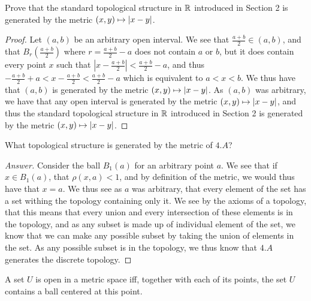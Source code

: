 \begin{majorEx}%
    Prove that the standard topological structure in $\mathbb{R}$ introduced in Section
    2 is generated by the metric $(x, y) \mapsto |x - y|$.
\end{majorEx}

\begin{proof}
  Let $(a,b)$ be an arbitrary open interval. We see that $\frac{a+b}{2}\in
  (a,b)$, and that $B_r(\frac{a+b}{2})$ where $r=\frac{a+b}{2}-a$ does
  not contain $a$ or $b$, but it does contain every point $x$ such
  that $|x-\frac{a+b}{2}|<\frac{a+b}{2}-a$, and thus 
  $-\frac{a+b}{2}+a<x-\frac{a+b}{2}<\frac{a+b}{2}-a$ which is
  equivalent to $a<x<b$. We thus have that $(a,b)$ is generated by the
  metric $(x, y) \mapsto |x - y|$. As $(a,b)$ was arbitrary, we
  have that any open interval is generated by the metric $(x, y)
  \mapsto |x - y|$, and thus the standard topological structure in
  $\mathbb{R}$ introduced in Section 2 is generated by the metric $(x, y)
  \mapsto |x - y|$.   
\end{proof}

\begin{minorEx}%
    What topological structure is generated by the metric of $4.A$?
\end{minorEx}

\begin{proof}[Answer]
  Consider the ball $B_1(a)$ for an arbitrary point $a$. We
  see that if $x \in B_1(a)$, that $\rho(x,a)<1$, and by definition of
  the metric, we would thus have that $x=a$. We thus see as $a$ was
  arbitrary, that every element of the set has a set withing the
  topology containing only it. We see by the axioms of a topology,
  that this means that every union and every intersection of these
  elements is in the topology, and as any subset is made up of
  individual element of the set, we know that we can make any possible subset
  by taking the union of elements in the set. As any possible subset
  is in the topology, we thus know that $4.A$ generates the discrete topology.
\end{proof}

\begin{majorEx}%
  A set $U$ is open in a metric space iff, together
  with each of its points, the set $U$ contains a
  ball centered at this point.
\end{majorEx}

